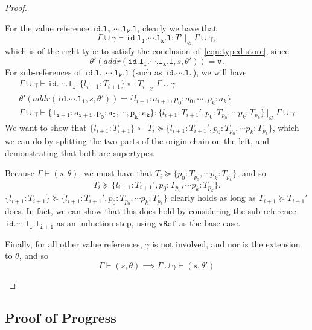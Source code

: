 \documentclass[12pt,a4paper,twoside,openright]{report}
\theoremstyle{definition}
\theoremstyle{dotless}
\newcommand*{\orig}{\ensuremath{\!\multimapinv\!}}
\begin{document}
\begin{proof}
\begin{case}[Assign]
\begin{subcase}[PropAssignType]
		For the value reference $\mathtt{id.l_1.\cdots.l_k.l}$, clearly we have that
		$$\Gamma\!\cup\!\gamma\vdash\mathtt{id.l_1.\cdots.l_k.l}:T'\ |_\varnothing\ \Gamma\!\cup\!\gamma,$$
		which is of the right type to satisfy the conclusion
		of~\eqref{eqn:typed-store}, since
		$$\theta'(addr(\mathtt{id.l_1.\cdots.l_k.l},s, \theta')) = \mathtt{v}.$$
		For sub-references of $\mathtt{id.l_1.\cdots.l_k.l}$ (such as $\mathtt{id.\cdots.l_i}$), we will have
		\begin{gather*}
		  \Gamma\!\cup\!\gamma\vdash\mathtt{id.\cdots.l_i}:\{l_{i+1}:T_{i+1}\}\orig T_i\ |_\varnothing\ \Gamma\!\cup\!\gamma \\
		  \theta'(addr(\mathtt{id.\cdots.l_i},s,\theta'))	= \{l_{i+1}:a_{i+1}, p_0:a_0,\cdots,p_k:a_k\} \\
		  \Gamma\!\cup\!\gamma\vdash\mathtt{\{l_{i+1}:a_{i+1}, p_0:a_0,\cdots,p_k:a_k\}} 
			  :\{l_{i+1}:T_{i+1}', p_0:T_{p_0},\cdots p_k:T_{p_k}\}\ |_\varnothing\ \Gamma\!\cup\!\gamma
	  	\end{gather*}
	  	We want to show that $\{l_{i+1}:T_{i+1}\}\orig T_i\succeq \{l_{i+1}:T_{i+1}', p_0:T_{p_0},\cdots p_k:T_{p_k}\}$, which we can 
		do by splitting the two parts of the origin chain on the left, and demonstrating that both
		are supertypes.

		Because $\Gamma\vdash(s,\theta)$, we must have that $T_i\succeq\{p_0:T_{p_0},\cdots p_k:T_{p_k}\}$, and so 
		$$T_i\succeq\{l_{i+1}:T_{i+1}', p_0:T_{p_0},\cdots p_k:T_{p_k}\}.$$
		$\{l_{i+1}:T_{i+1}\}\succeq \{l_{i+1}:T_{i+1}', p_0:T_{p_0},\cdots p_k:T_{p_k}\}$ clearly
		holds as long as $T_{i+1}\succeq T_{i+1}'$ does. In fact, we can show that this does hold
		by considering the sub-reference $\mathtt{id.\cdots.l_i.l_{i+1}}$ as an induction
		step, using $\mathtt{vRef}$ as the base case.

		Finally, for all other value references, $\gamma$ is not involved, and
		nor is the extension to $\theta$, and so
		$$\Gamma\vdash(s,\theta)\implies\Gamma\!\cup\!\gamma\vdash(s,\theta')$$ 
	  
	  \end{subcase}

  \end{case}
	
\end{proof}

\subsection{Proof of Progress}
\end{document}
